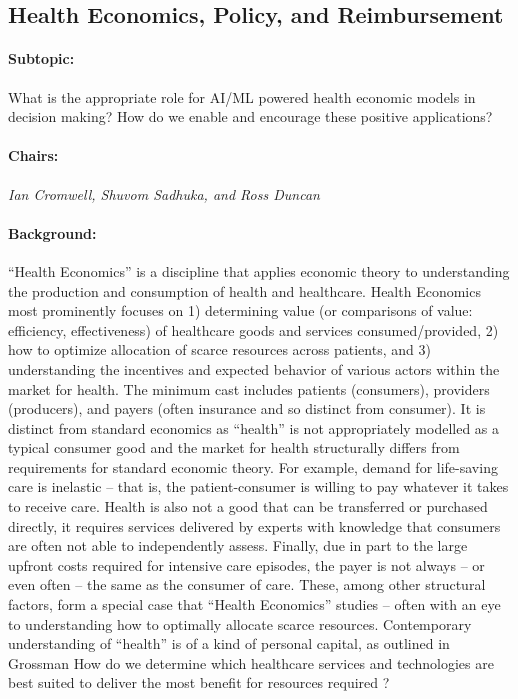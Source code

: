 \subsection{Health Economics, Policy, and Reimbursement}

\paragraph{Subtopic:} 
What is the appropriate role for AI/ML powered health economic models in decision making? How do we enable and encourage these positive applications?

\paragraph{Chairs:} \textit{Ian Cromwell, Shuvom Sadhuka, and Ross Duncan}

\paragraph{Background:}
“Health Economics” is a discipline that applies economic theory to understanding the production and consumption of health and healthcare. Health Economics most prominently focuses on 1) determining value (or comparisons of value: efficiency, effectiveness) of healthcare goods and services consumed/provided, 2) how to optimize allocation of scarce resources across patients, and 3) understanding the incentives and expected behavior of various actors within the market for health. The minimum cast includes patients (consumers), providers (producers), and payers (often insurance and so distinct from consumer). It is distinct from standard economics as “health” is not appropriately modelled as a typical consumer good and the market for health structurally differs from requirements for standard economic theory.  For example, demand for life-saving care is inelastic – that is, the patient-consumer is willing to pay whatever it takes to receive care. Health is also not a good that can be transferred or purchased directly, it requires services delivered by experts with knowledge that consumers are often not able to independently assess. Finally, due in part to the large upfront costs required for intensive care episodes, the payer is not always – or even often – the same as the consumer of care. These, among other structural factors, form a special case that “Health Economics” studies – often with an eye to understanding how to optimally allocate scarce resources. Contemporary understanding of “health” is of a kind of personal capital, as outlined in Grossman \citep{grossman} How do we determine which healthcare services and technologies are best suited to deliver the most benefit for resources required \citep{cadth}?

